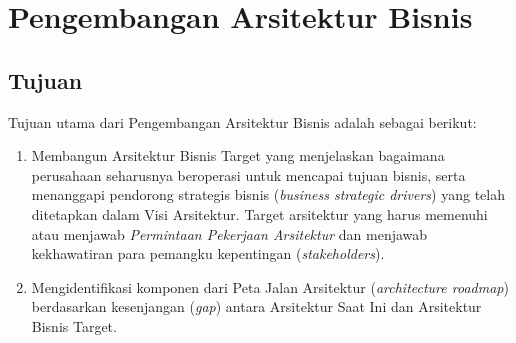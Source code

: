 \chapter{Pengembangan Arsitektur Bisnis}

\section{Tujuan}
Tujuan utama dari Pengembangan Arsitektur Bisnis adalah sebagai berikut:
\begin{enumerate}
	\item Membangun Arsitektur Bisnis Target yang menjelaskan bagaimana perusahaan seharusnya beroperasi untuk mencapai tujuan bisnis, serta menanggapi pendorong strategis bisnis (\textit{business strategic drivers}) yang telah ditetapkan dalam Visi Arsitektur. Target arsitektur yang harus memenuhi atau menjawab \textit{Permintaan Pekerjaan Arsitektur} dan menjawab kekhawatiran para pemangku kepentingan (\textit{stakeholders}).
	\item Mengidentifikasi komponen dari Peta Jalan Arsitektur (\textit{architecture roadmap}) berdasarkan kesenjangan (\textit{gap}) antara Arsitektur Saat Ini dan Arsitektur Bisnis Target.
\end{enumerate}

